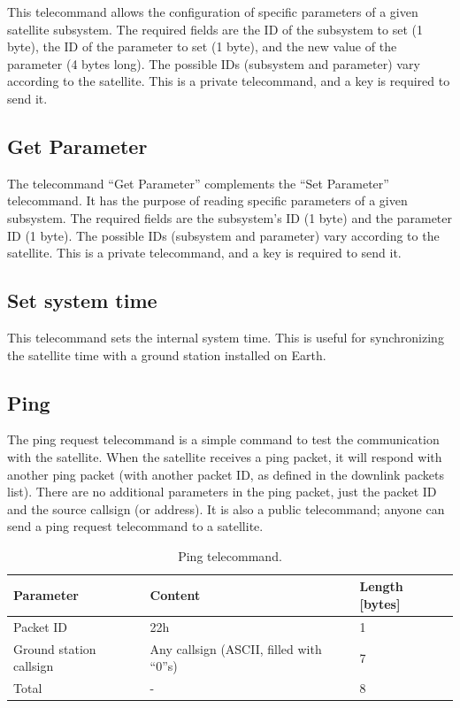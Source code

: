 This telecommand allows the configuration of specific parameters of a given satellite subsystem. The required fields are the ID of the subsystem to set (1 byte), the ID of the parameter to set (1 byte), and the new value of the parameter (4 bytes long). The possible IDs (subsystem and parameter) vary according to the satellite. This is a private telecommand, and a key is required to send it.

\subsection{Get Parameter}

The telecommand ``Get Parameter'' complements the ``Set Parameter'' telecommand. It has the purpose of reading specific parameters of a given subsystem. The required fields are the subsystem's ID (1 byte) and the parameter ID (1 byte). The possible IDs (subsystem and parameter) vary according to the satellite. This is a private telecommand, and a key is required to send it.

\subsection{Set system time}

This telecommand sets the internal system time. This is useful for synchronizing the satellite time with a ground station installed on Earth.

\subsection{Ping}

The ping request telecommand is a simple command to test the communication with the satellite. When the satellite receives a ping packet, it will respond with another ping packet (with another packet ID, as defined in the downlink packets list). There are no additional parameters in the ping packet, just the packet ID and the source callsign (or address). It is also a public telecommand; anyone can send a ping request telecommand to a satellite.

\begin{table}[!ht]
    \centering
    \begin{tabular}{lll}
        \toprule[1.5pt]
        \textbf{Parameter}      & \textbf{Content}                         & \textbf{Length [bytes]} \\
        \midrule
        Packet ID               & 22h                                      & 1 \\
        Ground station callsign & Any callsign (ASCII, filled with ``0''s) & 7 \\
        \midrule
        Total                   & -                                        & 8 \\
        \bottomrule[1.5pt]
    \end{tabular}
    \caption{Ping telecommand.}
    \label{tab:ping-tc}
\end{table}

